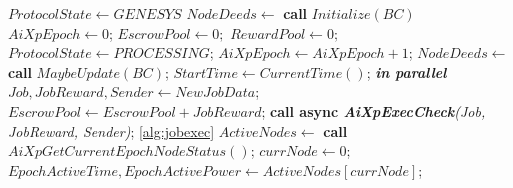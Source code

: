 \documentclass{article}
\begin{document}
\begin{algorithm}
\begin{algorithmic}[1]
    \State $ProtocolState \gets GENESYS$ \;\vspace{1mm}
    \State $NodeDeeds \gets$ \textbf{call} $Initialize(BC)$\; \vspace{1mm}
    \State $AiXpEpoch \gets 0$;\vspace{1mm}
    \State $EscrowPool \gets 0;$\vspace{1mm}
    \State $RewardPool \gets 0;$\vspace{1mm}
    \State $ProtocolState \gets PROCESSING$; \;\vspace{1mm}
    \vspace{1mm}
        \State $AiXpEpoch \gets AiXpEpoch + 1$;\vspace{1mm}
        \State $NodeDeeds \gets$ \textbf{call} $MaybeUpdate(BC)$;\vspace{1mm} \vspace{1mm}
        \State $StartTime \gets CurrentTime()$;\vspace{1mm}
        \vspace{1mm}
             \textbf{\textit{in parallel}}\vspace{1mm}
                \State $Job, JobReward, Sender \gets NewJobData$;\vspace{1mm}\vspace{1mm}
                \State $EscrowPool \gets EscrowPool + JobReward$;\vspace{1mm}
                \State \textbf{call async \textit{AiXpExecCheck}}\textit{(Job, JobReward, Sender)}; \ref{alg:jobexec}\vspace{1mm}
            \EndWhile\vspace{1mm}
        \EndWhile\vspace{1mm}
        \State $ActiveNodes \gets$ \textbf{call} $AiXpGetCurrentEpochNodeStatus()$;\vspace{1mm}
        \State $currNode \gets 0$;\vspace{1mm}
        \; \vspace{1mm}
            \State $EpochActiveTime, EpochActivePower \gets ActiveNodes[currNode]$;\vspace{1mm}

\end{algorithmic}
\end{algorithm}
\end{document}
